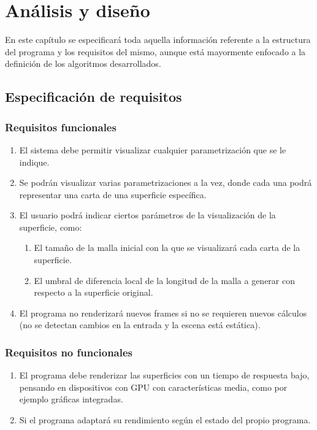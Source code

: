 
\chapter{Análisis y diseño}

En este capítulo se especificará toda aquella información referente a la estructura del programa y los requisitos del mismo, aunque está mayormente enfocado a la definición de los algoritmos desarrollados.

\section{Especificación de requisitos}

	\subsection{Requisitos funcionales}
	\begin{enumerate}
		\item El sistema debe permitir visualizar cualquier parametrización que se le indique.
		\item Se podrán visualizar varias parametrizaciones a la vez, donde cada una podrá representar una carta de una superficie específica.
		\item El usuario podrá indicar ciertos parámetros de la visualización de la superficie, como:
			\begin{enumerate}
				\item El tamaño de la malla inicial con la que se visualizará cada carta de la superficie.
				\item El umbral de diferencia local de la longitud de la malla a generar con respecto a la superficie original.
			\end{enumerate}
		\item El programa no renderizará nuevos frames si no se requieren nuevos cálculos (no se detectan cambios en la entrada y la escena está estática).
	\end{enumerate}

	\subsection{Requisitos no funcionales}
	\begin{enumerate}
		\item El programa debe renderizar las superficies con un tiempo de respuesta bajo, pensando en dispositivos con GPU con características media, como por ejemplo gráficas integradas.
		\item Si el programa adaptará su rendimiento según el estado del propio programa.
	\end{enumerate}

